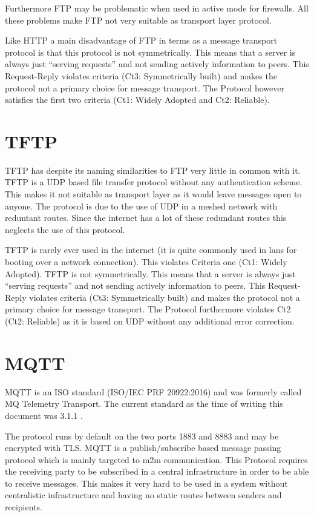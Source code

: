 Furthermore FTP may be problematic when used in active mode for firewalls. All these problems make FTP not very suitable as transport layer protocol.

Like HTTP a main disadvantage of FTP in terms as a message transport protocol is that this protocol is not symmetrically. This means that a server is always just ``serving requests'' and not sending actively information to peers. This Request-Reply violates criteria (Ct3: Symmetrically built) and makes the protocol not a primary choice for  message transport. The Protocol however satisfies the first two criteria  (Ct1: Widely Adopted and Ct2: Reliable).

\section{TFTP}
TFTP has despite its naming similarities to FTP very little in common with it. TFTP is a UDP based file transfer protocol without any authentication scheme. This makes it not suitable as transport layer as it would leave messages open to anyone. The protocol is due to the use of UDP in a meshed network with reduntant routes. Since the internet has a lot of these redundant routes this neglects the use of this protocol.

TFTP is rarely ever used in the internet (it is quite commonly used in lans for booting over a network connection). This violates Criteria one (Ct1: Widely Adopted). TFTP is not symmetrically. This means that a server is always just ``serving requests'' and not sending actively information to peers. This Request-Reply violates criteria (Ct3: Symmetrically built) and makes the protocol not a primary choice for  message transport. The Protocol furthermore violates Ct2 (Ct2: Reliable) as it is based on UDP without any additional error correction.

\section{MQTT}
MQTT is an ISO standard (ISO/IEC PRF 20922:2016) and was formerly called MQ Telemetry Transport. The current standard as the time of writing this document was 3.1.1 \cite{mqtt}. 

The protocol runs by default on the two ports 1883 and 8883 and may be encrypted with TLS. MQTT is a publish/subscribe based message passing protocol which is mainly targeted to m2m communication. This Protocol requires the receiving party to be subscribed in a central infrastructure in order to be able to receive messages. This makes it very hard to be used in a system without centralistic infrastructure and having no static routes between senders and recipients.

